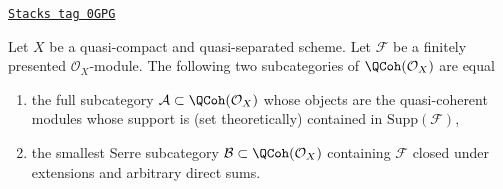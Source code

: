 \begin{lemma}
\label{functors-lemma-supported-on-support}
\href{https://stacks.math.columbia.edu/tag/0GPG}{\texttt{Stacks tag 0GPG}}

Let $X$ be a quasi-compact and quasi-separated scheme.
Let $\mathcal{F}$ be a finitely presented $\mathcal{O}_X$-module.
The following two subcategories of $\QCoh(\mathcal{O}_X)$ are equal
\begin{enumerate}
\item the full subcategory $\mathcal{A} \subset \QCoh(\mathcal{O}_X)$
whose objects are the quasi-coherent modules
whose support is (set theoretically) contained in $\text{Supp}(\mathcal{F})$,
\item the smallest Serre subcategory $\mathcal{B} \subset \QCoh(\mathcal{O}_X)$
containing
$\mathcal{F}$ closed under extensions and arbitrary direct sums.
\end{enumerate}
\end{lemma}


